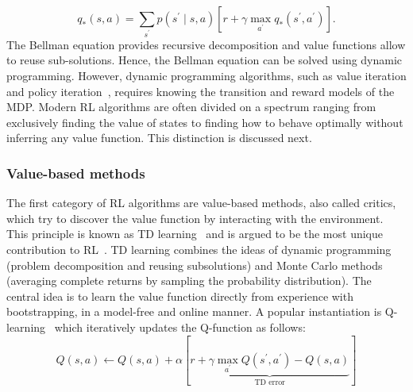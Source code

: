 \documentclass[\home/main.tex]{subfiles}
\begin{document}
\begin{equation}
	q_{*}(s, a)=\sum_{s^{\prime}} p\left(s^{\prime} \mid s, a\right)\left[r+\gamma \max _{a^{\prime}} q_{*}\left(s^{\prime}, a^{\prime}\right)\right].
\end{equation}
The Bellman equation provides recursive decomposition and value functions allow to reuse sub-solutions. Hence, the Bellman equation can be solved using dynamic programming. However, dynamic programming algorithms, such as value iteration and policy iteration~\autocite{Sutton2018}, requires knowing the transition and reward models of the MDP. Modern RL algorithms are often divided on a spectrum ranging from exclusively finding the value of states to finding how to behave optimally without inferring any value function. This distinction is discussed next.

\subsubsection{Value-based methods}
The first category of RL algorithms are value-based methods, also called critics, which try to discover the value function by interacting with the environment. This principle is known as \gls{TD} learning~\autocite{boyan2002technical} and is argued to be the most unique contribution to RL~\autocite{Sutton2018}. \gls{TD} learning combines the ideas of dynamic programming (problem decomposition and reusing subsolutions) and Monte Carlo methods (averaging complete returns by sampling the probability distribution). The central idea is to learn the value function directly from experience with bootstrapping, in a model-free and online manner. A popular instantiation is Q-learning~\autocite{watkins1992q} which iteratively updates the Q-function as follows:
\begin{equation} \label{eq:q-learning-update-rule}
	Q(s, a) \leftarrow Q(s, a)+\alpha\left[\underbrace{r+\gamma \max _{a^{\prime}} Q\left(s^{\prime}, a^{\prime}\right)-Q(s, a)}_{\text{TD error}}\right]
\end{equation}
\end{document}
